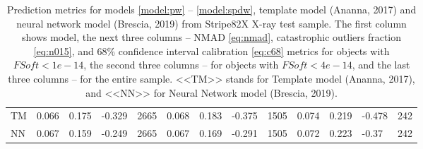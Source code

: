 \documentclass[fleqn,usenatbib]{mnras}
\begin{document}
\begin{table}
\begin{tabular}{llllrlllrlllr}
            TM &                             0.066 &           0.175 &           -0.329 &        2665 &                             0.068 &           0.183 &           -0.375 &        1505 &                            0.074 &           0.219 &          -0.478 &         242 \\
            NN              &                             0.067 &           0.159 &           -0.249 &        2665 &                             0.067 &           0.169 &           -0.291 &        1505 &                            0.072 &           0.223 &           -0.37 &         242 \\
            \hline
            \end{tabular}
            \caption{Prediction metrics for models \ref{model:pw} -- \ref{model:spdw}, template model (Ananna, 2017) and neural network model (Brescia, 2019) from Stripe82X X-ray test sample. The first column shows model, the next three columns -- NMAD \eqref{eq:nmad}, catastrophic outliers fraction \eqref{eq:n015}, and 68\% confidence interval calibration \eqref{eq:c68} metrics for objects with $FSoft < 1e-14$, the second three columns -- for objects with $FSoft < 4e-14$, and the last three columns -- for the entire sample. <<TM>> stands for Template model (Ananna, 2017), and <<NN>> for Neural Network model (Brescia, 2019).}
\end{table}
\end{document}
